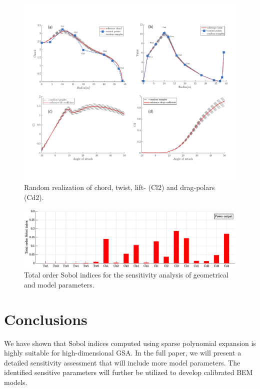 \documentclass[11pt]{article}
\begin{document}
\begin{figure}[h!]
 \centering
 \includegraphics[trim={0 1.6cm 0 0},clip, scale=0.65]{figure1.pdf}
 \caption{Random realization of chord, twist, lift- (Cl2) and drag-polars (Cd2).}
 \label{fig:samples}
\end{figure}
\begin{figure}[h!]
 \centering
  \includegraphics[width=\linewidth]{SA_Power_chord_twist_Cl_Cd.eps}
 \caption{Total order Sobol indices for the sensitivity analysis of geometrical and model parameters.}
  \label{fig:Sobol}
\end{figure}
\section{Conclusions}
We have shown that Sobol indices computed using sparse polynomial expansion is highly suitable for high-dimensional GSA. In the full paper, we will present a detailed sensitivity assessment that will include more model parameters. The identified sensitive parameters will further be utilized to develop calibrated BEM models.


\end{document}
